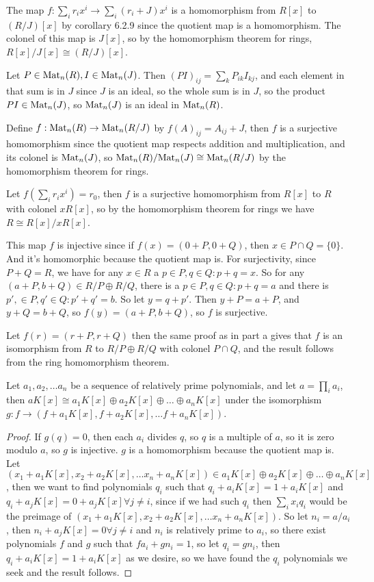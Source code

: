 \documentclass[11pt, oneside]{article}   	%
\begin{document}
The map $f: \sum_i r_ix^i \to \sum_i (r_i + J)x^i$ is a homomorphism from $R[x]$ to $(R/J)[x]$ by corollary 6.2.9 since the quotient map is a homomorphism. The colonel of this map is $J[x]$, so by the homomorphism theorem for rings, $R[x]/J[x] \cong (R/J)[x]$.
\item Let $P\in \text{Mat}_n(R), I \in \text{Mat}_n(J)$. Then $(PI)_{ij} = \sum_k P_{ik}I_{kj}$, and each element in that sum is in $J$ since $J$ is an ideal, so the whole sum is in $J$, so the product $PI \in \text{Mat}_n(J)$, so $\text{Mat}_n(J)$ is an ideal in $\text{Mat}_n(R)$.

Define $f: \text{Mat}_n(R) \to \text{Mat}_n(R/J)$ by $f(A)_{ij} = A_{ij} + J$, then $f$ is a surjective homomorphism since the quotient map respects addition and multiplication, and its colonel is $\text{Mat}_n(J)$, so $\text{Mat}_n(R) / \text{Mat}_n(J) \cong \text{Mat}_n(R/J)$ by the homomorphism theorem for rings.
\item Let $f(\sum_i r_ix^i) = r_0$, then $f$ is a surjective homomorphism from $R[x]$ to $R$ with colonel $xR[x]$, so by the homomorphism theorem for rings we have $R \cong R[x] / xR[x]$.
\item \be
\item This map $f$ is injective since if $f(x) = (0 + P, 0 + Q)$, then $x \in P \cap Q = \{0\}$. And it's homomorphic because the quotient map is. For surjectivity, since $P + Q = R$, we have for any $x \in R$ a $p \in P, q \in Q: p + q = x$. So for any $(a + P, b + Q) \in R/P \oplus R/Q$, there is a $p \in P, q \in Q: p + q = a$ and there is $p', \in P, q' \in Q: p' + q' = b$. So let $y = q + p'$. Then $y + P = a + P$, and $y + Q = b + Q$, so $f(y) = (a + P, b + Q)$, so $f$ is surjective. 
\item Let $f(r) = (r + P, r + Q)$ then the same proof as in part a gives that $f$ is an isomorphism from $R$ to $R/P \oplus R/Q$ with colonel $P \cap Q$, and the result follows from the ring homomorphism theorem.
\ee 
\item Let $a_1, a_2, \ldots a_n$ be a sequence of relatively prime polynomials, and let $a = \prod_ia_i$, then $aK[x] \cong a_1K[x] \oplus a_2K[x] \oplus \ldots \oplus a_nK[x]$ under the isomorphism $g: f \to (f + a_1K[x], f + a_2K[x], \ldots f + a_nK[x])$.
\begin{proof}
If $g(q) = 0$, then each $a_i$ divides $q$, so $q$ is a multiple of $a$, so it is zero modulo $a$, so $g$ is injective. $g$ is a homomorphism because the quotient map is. Let $(x_1 + a_1K[x], x_2 + a_2K[x], \ldots x_n + a_nK[x]) \in a_1K[x] \oplus a_2K[x] \oplus \ldots \oplus a_nK[x]$, then we want to find polynomials $q_i$ such that $q_i + a_iK[x] = 1 + a_iK[x]$ and $q_i + a_jK[x] = 0 + a_jK[x] \forall j\not= i$, since if we had such $q_i$ then $\sum_i x_iq_i$ would be the preimage of $(x_1 + a_1K[x], x_2 + a_2K[x], \ldots x_n + a_nK[x])$. So let $n_i = a / a_i$, then $n_i + a_jK[x] = 0 \forall j \not= i$ and $n_i$ is relatively prime to $a_i$, so there exist polynomials $f$ and $g$ such that $fa_i + gn_i = 1$, so let $q_i = gn_i$, then $q_i + a_iK[x] = 1 + a_iK[x]$ as we desire, so we have found the $q_i$ polynomials we seek and the result follows.
\end{proof}
\ee 
\end{document}
